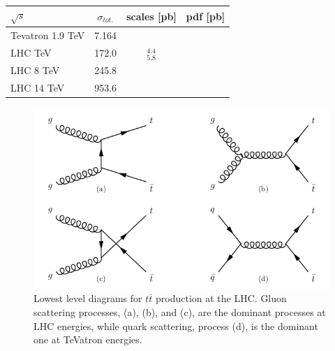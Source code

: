 \begin{table} \label{tab-}
\begin{center}
\begin{tabular}{lccc}
\hline
\hline
\textbf{$\sqrt{s}$} & \textbf{$\sigma_{tot.}$} & \textbf{scales [pb]} & \textbf{pdf [pb]} \\
\hline
Tevatron 1.9 TeV & 7.164 & & \\
LHC TeV & 172.0 & $^4.4_5.8$ &  \\ 
LHC 8 TeV & 245.8 & & \\
LHC 14 TeV & 953.6 & & \\
\hline
\hline
\end{tabular}
\caption{\cite{Czakon:2013goa}}
\end{center}
\end{table}

\begin{figure} \label{fig-ttbarProductionLHC}
\begin{center}
\includegraphics[width=\textwidth]{Figures/ttbarProductionLHC.png}
\caption{Lowest level diagrams for $t\bar{t}$ production at the LHC. Gluon scattering processes, {(a)}, {(b)}, and {(c)}, are the dominant processes at LHC energies, while quark scattering, process {(d)}, is the dominant one at TeVatron energies. \cite{SergeyThesis}}
\end{center}
\end{figure}

